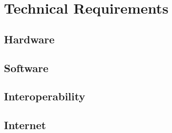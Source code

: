 \section{Technical Requirements}

\subsection{Hardware}

\subsection{Software}

\subsection{Interoperability}

\subsection{Internet}

